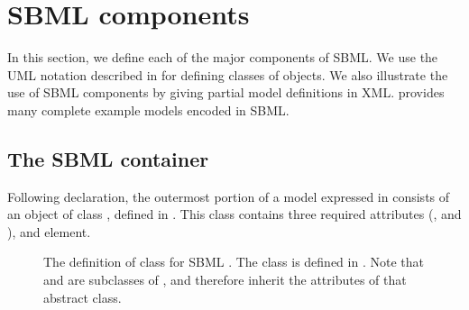 
\section{SBML components}
\label{sec:elements}

In this section, we define each of the major components of SBML.
We use the UML notation described in
 for defining classes of objects.
We also illustrate the use of SBML components by giving partial
model definitions in XML.   provides many
complete example models encoded in SBML.


\subsection{The SBML container}
\label{sec:sbml}

Following 
declaration, the outermost portion of a model expressed in \thisL
consists of an object of class \SBML, defined in
.  This class contains three required
attributes (,  and ), and
  element.

\begin{figure}[htb]
  \vspace{-1ex}
  \centering
  \small
  \vspace{1.5ex}
  \caption{The definition of class \SBML for SBML \thisLV.  The
    class \Model is defined in .  Note that
    \SBML and \Model are subclasses of \SBaseUpright, and therefore
    inherit the attributes of that abstract class.}
  \label{fig:sbml}
\end{figure}

